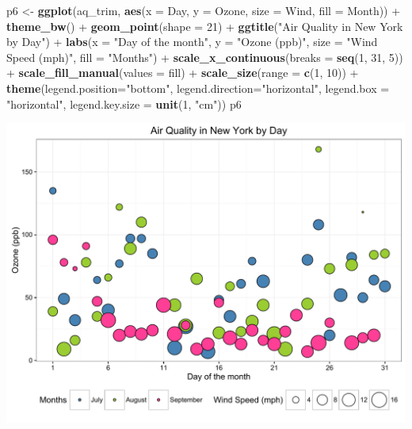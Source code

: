 \documentclass[]{article}
\newenvironment{Shaded}{\begin{snugshade}}{\end{snugshade}}
\newcommand{\KeywordTok}[1]{\textcolor[rgb]{0.13,0.29,0.53}{\textbf{{#1}}}}
\newcommand{\DataTypeTok}[1]{\textcolor[rgb]{0.13,0.29,0.53}{{#1}}}
\newcommand{\DecValTok}[1]{\textcolor[rgb]{0.00,0.00,0.81}{{#1}}}
\newcommand{\StringTok}[1]{\textcolor[rgb]{0.31,0.60,0.02}{{#1}}}
\newcommand{\NormalTok}[1]{{#1}}
\begin{document}
\begin{Shaded}
\begin{Highlighting}[]
\NormalTok{p6 <-}\StringTok{ }\KeywordTok{ggplot}\NormalTok{(aq_trim, }\KeywordTok{aes}\NormalTok{(}\DataTypeTok{x =} \NormalTok{Day, }\DataTypeTok{y =} \NormalTok{Ozone, }\DataTypeTok{size =} \NormalTok{Wind, }\DataTypeTok{fill =} \NormalTok{Month)) +}\StringTok{ }\KeywordTok{theme_bw}\NormalTok{() +}
\StringTok{      }\KeywordTok{geom_point}\NormalTok{(}\DataTypeTok{shape =} \DecValTok{21}\NormalTok{) +}
\StringTok{      }\KeywordTok{ggtitle}\NormalTok{(}\StringTok{"Air Quality in New York by Day"}\NormalTok{) +}\StringTok{ }
\StringTok{      }\KeywordTok{labs}\NormalTok{(}\DataTypeTok{x =} \StringTok{"Day of the month"}\NormalTok{, }\DataTypeTok{y =} \StringTok{"Ozone (ppb)"}\NormalTok{,}
       \DataTypeTok{size =} \StringTok{"Wind Speed (mph)"}\NormalTok{, }\DataTypeTok{fill =} \StringTok{"Months"}\NormalTok{) +}
\StringTok{      }\KeywordTok{scale_x_continuous}\NormalTok{(}\DataTypeTok{breaks =} \KeywordTok{seq}\NormalTok{(}\DecValTok{1}\NormalTok{, }\DecValTok{31}\NormalTok{, }\DecValTok{5}\NormalTok{)) +}
\StringTok{      }\KeywordTok{scale_fill_manual}\NormalTok{(}\DataTypeTok{values =} \NormalTok{fill) +}
\StringTok{      }\KeywordTok{scale_size}\NormalTok{(}\DataTypeTok{range =} \KeywordTok{c}\NormalTok{(}\DecValTok{1}\NormalTok{, }\DecValTok{10}\NormalTok{)) +}
\StringTok{      }\KeywordTok{theme}\NormalTok{(}\DataTypeTok{legend.position=}\StringTok{"bottom"}\NormalTok{, }\DataTypeTok{legend.direction=}\StringTok{"horizontal"}\NormalTok{,}
            \DataTypeTok{legend.box =} \StringTok{"horizontal"}\NormalTok{,}
            \DataTypeTok{legend.key.size =} \KeywordTok{unit}\NormalTok{(}\DecValTok{1}\NormalTok{, }\StringTok{"cm"}\NormalTok{))}
\NormalTok{p6}
\end{Highlighting}
\end{Shaded}

\begin{center}\includegraphics{0_all_posts_pdf/wscatter_17-1} \end{center}
\end{document}
